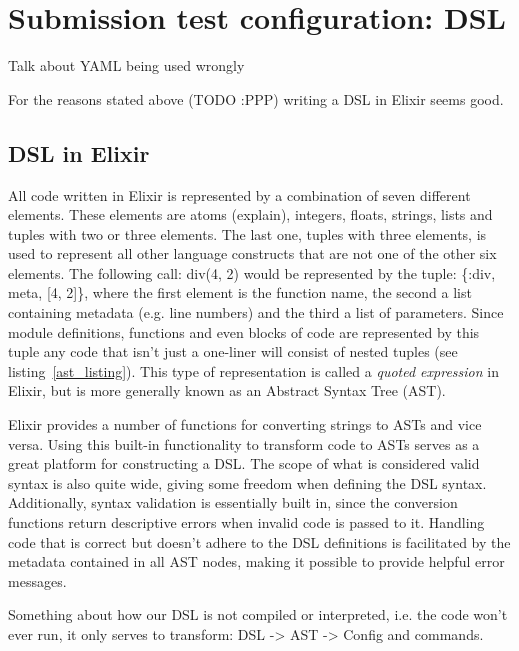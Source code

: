 
\section{Submission test configuration: DSL}

Talk about YAML being used wrongly

For the reasons stated above (TODO :PPP) writing a DSL in Elixir seems good.

\label{dsl_elixir}
\subsection{DSL in Elixir}
All code written in Elixir is represented by a combination of seven different elements. These elements are atoms (explain), integers, floats, strings, lists and tuples with two or three elements. The last one, tuples with three elements, is used to represent all other language constructs that are not one of the other six elements. The following call: div(4, 2) would be represented by the tuple: \{:div, meta, [4, 2]\}, where the first element is the function name, the second a list containing metadata (e.g. line numbers) and the third a list of parameters. Since module definitions, functions and even blocks of code are represented by this tuple any code that isn't just a one-liner will consist of nested tuples (see listing~\ref{ast_listing}). This type of representation is called a \textit{quoted expression} in Elixir, but is more generally known as an Abstract Syntax Tree (AST).

Elixir provides a number of functions for converting strings to ASTs and vice versa. Using this built-in functionality to transform code to ASTs serves as a great platform for constructing a DSL. The scope of what is considered valid syntax is also quite wide, giving some freedom when defining the DSL syntax. Additionally, syntax validation is essentially built in, since the conversion functions return descriptive errors when invalid code is passed to it. Handling code that is correct but doesn't adhere to the DSL definitions is facilitated by the metadata contained in all AST nodes, making it possible to provide helpful error messages.  

Something about how our DSL is not compiled or interpreted, i.e. the code won't ever run, it only serves to transform: DSL -> AST -> Config and commands.

